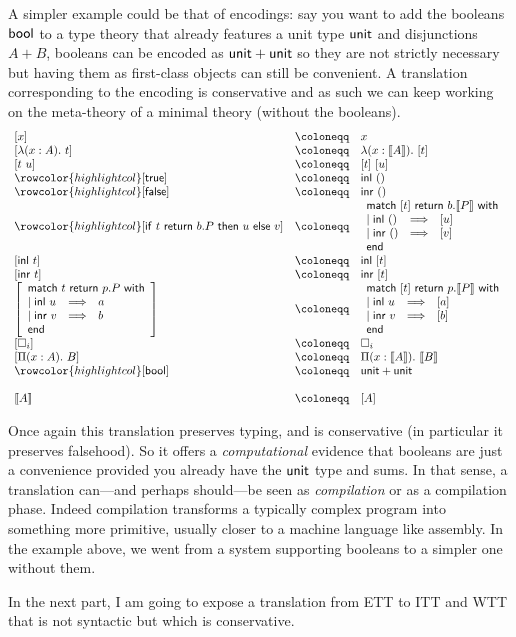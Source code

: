 A simpler example could be that of encodings: say you want to add the booleans
\(\mathsf{bool}\) to a type theory that already features a unit type \(\mathsf{unit}\) and
disjunctions \(A + B\), booleans can be encoded as \(\mathsf{unit} + \mathsf{unit}\) so they
are not strictly necessary but having them as first-class objects can still be
convenient. A translation corresponding to the encoding is conservative and as
such we can keep working on the meta-theory of a minimal theory (without
the booleans).
%
\[
\begin{array}{lcl}
  [ x ] &\coloneqq& x \\ \relax
  [ \lambda (x : A).\ t ] &\coloneqq& \lambda (x : \transl{A}).\ [t] \\
  \relax
  [ t\ u ] &\coloneqq& [t]\ [u] \\
  \rowcolor{highlightcol} \relax
  [ \ttrue ] &\coloneqq& \inl\ \tunit \\
  \rowcolor{highlightcol} \relax
  [ \ffalse ] &\coloneqq& \inr\ \tunit \\
  \rowcolor{highlightcol} \relax
  [ \tif{t}{b. P}{u}{v} ] &\coloneqq&
  \pmatch{[t]}{b. \transl{P}}{\branch{\inl\ \tunit}{[u]} \\ \branch{\inr\ \tunit}{[v]}} \\
  \relax
  [ \inl\ t ] &\coloneqq& \inl\ [t] \\ \relax
  [ \inr\ t ] &\coloneqq& \inr\ [t] \\ \relax
  \left[ \pmatch{t}{p. P}{\branch{\inl\ u}{a} \\ \branch{\inr\ v}{b}} \right]
  &\coloneqq&
  \pmatch{[t]}{p. \transl{P}}{\branch{\inl\ u}{[a]} \\ \branch{\inr\ v}{[b]}} \\
  \relax
  [ \Ty{i} ] &\coloneqq& \Ty{i} \\ \relax
  [ \Pi (x : A).\ B ] &\coloneqq& \Pi (x : \transl{A}).\ \transl{B} \\
  \rowcolor{highlightcol} \relax
  [ \bool ] &\coloneqq& \unit + \unit \\ \relax
  \\
  \transl{A} &\coloneqq& [A]
\end{array}
\]

Once again this translation preserves typing, and is conservative (in particular
it preserves falsehood). So it offers a \emph{computational} evidence that
booleans are just a convenience provided you already have the \(\mathsf{unit}\) type and
sums. In that sense, a translation can---and perhaps should---be seen as
\emph{compilation} or as a compilation phase.
Indeed compilation transforms a typically complex program into something more
primitive, usually closer to a machine language like assembly. In the example
above, we went from a system supporting booleans to a simpler one without them.

In the next part, I am going to expose a translation from \acrshort{ETT} to
\acrshort{ITT} and \acrshort{WTT} that is not syntactic but which is
conservative.
